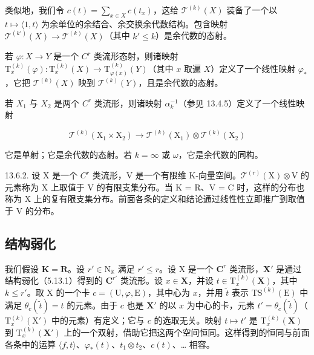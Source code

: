类似地，我们令 \(c(t) = \sum_{x \in X} c(t_x)\)，这给 \(\mathcal{T}^{(k)}(X)\) 装备了一个以 \(t \mapsto \langle 1, t \rangle\) 为余单位的余结合、余交换余代数结构。包含映射 \(\mathcal{T}^{(k')}(X) \to \mathcal{T}^{(k)}(X)\)（其中 \(k' \leqslant k\)）是余代数的态射。

若 \(\varphi: X \to Y\) 是一个 \(C^r\) 类流形态射，则诸映射 \(\mathrm{T}_x^{(k)}(\varphi): \mathrm{T}_x^{(k)}(X) \to \mathrm{T}_{\varphi(x)}^{(k)}(Y)\)（其中 \(x\) 取遍 \(X\)）定义了一个线性映射 \(\varphi_*\)，它把 \(\mathcal{T}^{(k)}(X)\) 映到 \(\mathcal{T}^{(k)}(Y)\)，且是余代数的态射。

若 \(X_{1}\) 与 \(X_{2}\) 是两个 \(C^{r}\) 类流形，则诸映射 \(\alpha_{k}^{-1}\)（参见 13.4.5）定义了一个线性映射

\[
\mathcal {T} ^ {(k)} \left(\mathrm{X} _ {1} \times \mathrm{X} _ {2}\right)\rightarrow \mathcal {T} ^ {(k)} \left(\mathrm{X} _ {1}\right) \otimes \mathcal {T} ^ {(k)} \left(\mathrm{X} _ {2}\right)
\]

它是单射；它是余代数的态射。若 \(k = \infty\) 或 \(\omega\)，它是余代数的同构。

13.6.2. 设 X 是一个 \(C^{r}\) 类流形，V 是一个有限维 K-向量空间。\(\mathcal{T}^{(r)}(\mathrm{X})\otimes\mathrm{V}\) 的元素称为 X 上取值于 V 的有限支集分布。当 K = R、V = C 时，这样的分布也称为 X 上的复有限支集分布。前面各条的定义和结论通过线性性立即推广到取值于 V 的分布。

\subsection{结构弱化}

我们假设 \(\mathbf{K} = \mathbf{R}\)。设 \(r' \in \mathrm{N}_{\mathbb{K}}\) 满足 \(r' \leqslant r\)。设 X 是一个 \(\mathbf{C}^{r}\) 类流形，\(\mathbf{X}'\) 是通过结构弱化（5.13.1）得到的 \(\mathbf{C}^{r'}\) 类流形。设 \(x \in \mathbf{X}\)，并设 \(t \in \mathrm{T}_x^{(k)}(\mathbf{X})\)，其中 \(k \leqslant r'\)。取 X 的一个卡 \(c = (\mathrm{U}, \varphi, \mathrm{E})\)，其中心为 \(x\)，并用 \(\tilde{t}\) 表示 \(\mathrm{TS}^{(k)}(\mathrm{E})\) 中满足 \(\theta_c(\tilde{t}) = t\) 的元素。由于 \(c\) 也是 \(\mathbf{X}'\) 的以 \(x\) 为中心的卡，元素 \(t' = \theta_c(\tilde{t})\)（\(\mathrm{T}_x^{(k)}(\mathrm{X}')\) 中的元素）有定义；它与 \(c\) 的选取无关。映射 \(t \mapsto t'\) 是 \(\mathrm{T}_x^{(k)}(\mathbf{X})\) 到 \(\mathrm{T}_x^{(k)}(\mathbf{X}')\) 上的一个双射，借助它把这两个空间恒同。这样得到的恒同与前面各条中的运算 \(\langle f, t \rangle\)、\(\varphi_*(t)\)、\(t_1 \otimes t_2\)、\(c(t)\)、\ldots{} 相容。

